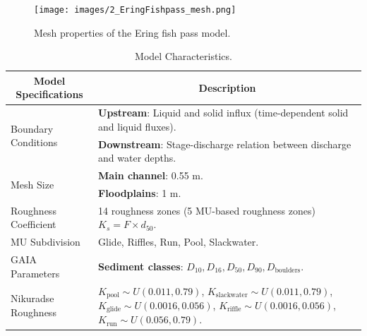 \documentclass[draft,linenumbers,onecolumn]{agujournal2019} %
\begin{document}







\begin{figure}[!htbp]
	\centering
	\texttt{[image: images/2\_EringFishpass\_mesh.png]}
	\caption{Mesh properties of the Ering fish pass model.}
	\label{fig:Mesh}
\end{figure}


\begin{table}[H] 
	\centering
	\caption{Model Characteristics.}
	\begin{tabular}{p{4cm} p{10cm}}
		\hline
		\multicolumn{1}{c}{\textbf{Model Specifications}} & \multicolumn{1}{c}{\textbf{Description}} \\ \hline
		\multirow{2}{4cm}{Boundary Conditions} & \textbf{Upstream}: Liquid and solid influx (time-dependent solid and liquid fluxes). \\ 
		& \textbf{Downstream}: Stage-discharge relation between discharge and water depths. \\ \hline
		\multirow{2}{4cm}{Mesh Size} & \textbf{Main channel}: 0.55 m. \\ 
		& \textbf{Floodplains}: 1 m. \\ \hline
		Roughness Coefficient & 14 roughness zones (5 MU-based roughness zones) \( K_{s} = F \times d_{50} \). \\ \hline
		MU Subdivision & Glide, Riffles, Run, Pool, Slackwater. \\ \hline
		\multirow{1}{4cm}{GAIA Parameters} & \textbf{Sediment classes}: \( D_{10}, D_{16}, D_{50}, D_{90}, D_{\text{boulders}} \). \\ \hline
		Nikuradse Roughness & 
		\( K_{\text{pool}} \sim U(0.011, 0.79) \), 
		\( K_{\text{slackwater}} \sim U(0.011, 0.79) \), 
		\( K_{\text{glide}} \sim U(0.0016, 0.056) \), 
		\( K_{\text{riffle}} \sim U(0.0016, 0.056) \), 
		\( K_{\text{run}} \sim U(0.056, 0.79) \). \\ \hline
	\end{tabular}
	\label{tab:model_characteristics}
\end{table}
 \vspace{-20pt}      
\FloatBarrier
\end{document}

